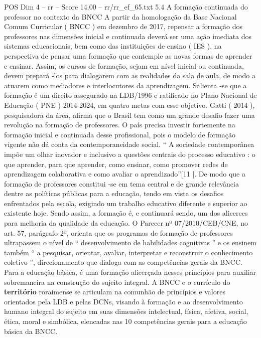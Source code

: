 \begin{textsample}{POS Dim 4 – rr – Score 14.00 – rr/rr\_ef\_65.txt}  \label{ex:f4_pos_113}
5.4 A formação continuada do professor no contexto da BNCC A partir da homologação da Base Nacional Comum Curricular ( BNCC ) em dezembro de 2017, repensar a formação dos professores nas dimensões inicial e continuada deverá ser uma ação imediata dos sistemas educacionais, bem como das instituições de ensino ( IES ), na perspectiva de pensar uma formação que contemple as novas formas de aprender e ensinar.
Assim, os cursos de formação, sejam em nível inicial ou continuada, devem prepará -los para dialogarem com as realidades da sala de aula, de modo a atuarem como mediadores e interlocutores da aprendizagem.
Salienta -se que a formação é um direito assegurado na LDB/1996 e ratificado no Plano Nacional de Educação ( PNE ) 2014-2024, em quatro metas com esse objetivo.
Gatti ( 2014 ), pesquisadora da área, afirma que o Brasil tem como um grande desafio fazer uma revolução na formação de professores.
O país precisa investir fortemente na formação inicial e continuada desse profissional, pois o modelo de formação vigente não dá conta da contemporaneidade social. “ A sociedade contemporânea impõe um olhar inovador e inclusivo a questões centrais do processo educativo : o que aprender, para que aprender, como ensinar, como promover redes de aprendizagem colaborativa e como avaliar o aprendizado”[11 ].
De modo que a formação de professores constitui -se em tema central e de grande relevância dentre as políticas públicas para a educação, tendo em vista os desafios enfrentados pela escola, exigindo um trabalho educativo diferente e superior ao existente hoje.
Sendo assim, a formação é, e continuará sendo, um dos alicerces para melhoria da qualidade da educação.
O Parecer nº 07/2010/CEB/CNE, no art. 57, parágrafo 2º, orienta que os programas de formação de professores ultrapassem o nível de “ desenvolvimento de habilidades cognitivas ” e os ensinem também “ a pesquisar, orientar, avaliar, interpretar e reconstruir o conhecimento coletivo ”, direcionamento que dialoga com as competências gerais da BNCC.
Para a educação básica, é uma formação alicerçada nesses princípios para auxiliar sobremaneira na construção do sujeito integral.
A BNCC e o currículo do \textbf{território} roraimense se articulam na comunhão de princípios e valores orientados pela LDB e pelas DCNs, visando à formação e ao desenvolvimento humano integral do sujeito em suas dimensões intelectual, física, afetiva, social, ética, moral e simbólica, elencadas nas 10 competências gerais para a educação básica da BNCC.

\end{textsample}
